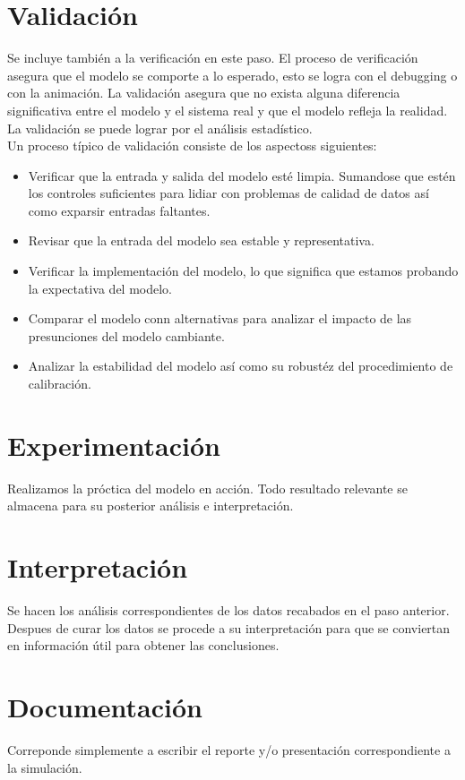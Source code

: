 \documentclass[letterpaper, 12pt]{article}
\begin{document}
\begin{justify}
        \section*{Validación}
        \justify
        Se incluye también a la verificación en este paso. El proceso de verificación asegura que el modelo se comporte a lo esperado, esto se logra con el debugging o con la animación. La validación asegura que no exista alguna diferencia significativa entre el modelo
        y el sistema real y que el modelo refleja la realidad. La validación se puede lograr por el análisis estadístico.
        \\\newline
        Un proceso típico de validación consiste de los aspectoss siguientes:
        \begin{itemize}
            \item Verificar que la entrada y salida del modelo esté limpia. Sumandose que estén los controles suficientes para lidiar con problemas de calidad de datos así como exparsir entradas faltantes.
            \item Revisar que la entrada del modelo sea estable y representativa.
            \item Verificar la implementación del modelo, lo que significa que estamos probando la expectativa del modelo.
            \item Comparar el modelo conn alternativas para analizar el impacto de las presunciones del modelo cambiante.
            \item Analizar la estabilidad del modelo así como su robustéz del procedimiento de calibración.
        \end{itemize}
        \section*{Experimentación}
        \justify
        Realizamos la próctica del modelo en acción. Todo resultado relevante se almacena para su posterior análisis e interpretación.
        \section*{Interpretación}
        \justify
        Se hacen los análisis correspondientes de los datos recabados en el paso anterior. Despues de curar los datos se procede a su interpretación para que se conviertan en información útil para obtener las conclusiones.
        \section*{Documentación}
        \justify
        Correponde simplemente a escribir el reporte y/o presentación correspondiente a la simulación.
        

\end{justify}
\end{document}
